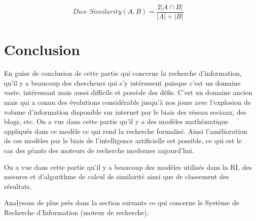 \[
    \textit{Dice Similarity}(A, B) = \frac{2 |A \cap B|}{|A| + |B|}
\]

\section{Conclusion}
En guise de conclusion de cette partie qui concerne la recherche d'information, qu'il y a beaucoup des chercheurs qui s'y intéressent puisque c'est un domaine vaste, intéressant mais aussi difficile et possède des défis. C'est un domaine ancien mais qui a connu des évolutions considérable jusqu’à nos jours avec l'explosion de volume d'information disponible sur internet par le biais des réseau sociaux, des blogs, etc. On a vue dans cette partie qu'il y a des modèles mathématique appliqués dans ce modèle ce qui rend la recherche formalisé. Ainsi l'amélioration de ces modèles par le biais de l’intelligence artificielle est possible, ce qui est le cas des géants des moteurs de recherche modernes aujourd'hui.

On a vue dans cette partie qu'il y a beaucoup des modèles utilisés dans la RI, des mesures et d'algorithme de calcul de similarité ainsi que de classement des résultats.

Analysons de plus près dans la section suivante ce qui concerne le Système de Recherche d'Information (moteur de recherche).